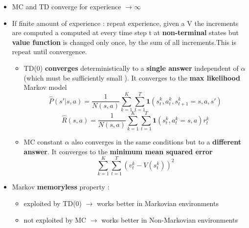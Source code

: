 \documentclass[12pt]{article} %
\begin{document}
\begin{itemize}
\item MC and TD converge for experience $\to \infty$
\item If finite amount of experience : repeat experience, given a V the increments are computed a computed at every time step t at \textbf{non-terminal} states but \textbf{value function} is changed only once, by the sum of all increments.This is repeat until convergence.
\begin{itemize}
\item TD(0) \textbf{converges} deterministically to a \textbf{single answer} independent of $\alpha$ (which must be sufficiently small ). It converges to the \textbf{max likelihood} Markov model
$$ \hat{P}(s'|s,a)= \frac{1}{N(s,a)}\sum_{k=1}^K\sum_{t=1}^T \bm{1}(s^k_t, a^k_t, s^k_{t+1}= s,a,s')$$
$$ \hat{R}(s,a)= \frac{1}{N(s,a)}\sum_{k=1}^K\sum_{t=1}^T \bm{1}(s^k_t, a^k_t = s,a)r_t^k$$
\item MC constant $\alpha$ also converges in the same conditions but to a \textbf{different answer}. It converges to the \textbf{minimum mean squared error}
$$ \sum_{k=1}^K\sum_{t=1}^T (v_t^k - V(s_t^k))^2$$
\end{itemize}
\item Markov \textbf{memoryless} property :
\begin{itemize}
\item  exploited by TD(0) $\rightarrow$ works better in Markovian environments
\item not exploited by MC $\rightarrow$ works better in Non-Markovian environments
\end{itemize}
\end{itemize}
\end{document}
